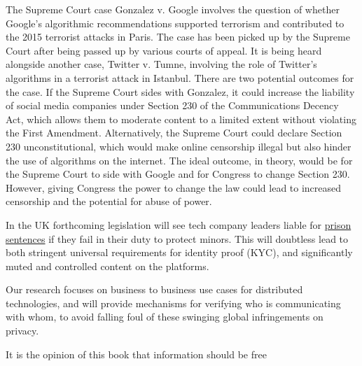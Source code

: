 The Supreme Court case Gonzalez v. Google involves the question of whether Google's algorithmic recommendations supported terrorism and contributed to the 2015 terrorist attacks in Paris. The case has been picked up by the Supreme Court after being passed up by various courts of appeal. It is being heard alongside another case, Twitter v. Tumne, involving the role of Twitter's algorithms in a terrorist attack in Istanbul. There are two potential outcomes for the case. If the Supreme Court sides with Gonzalez, it could increase the liability of social media companies under Section 230 of the Communications Decency Act, which allows them to moderate content to a limited extent without violating the First Amendment. Alternatively, the Supreme Court could declare Section 230 unconstitutional, which would make online censorship illegal but also hinder the use of algorithms on the internet. The ideal outcome, in theory, would be for the Supreme Court to side with Google and for Congress to change Section 230. However, giving Congress the power to change the law could lead to increased censorship and the potential for abuse of power.\par
In the UK forthcoming legislation will see tech company leaders liable for \href{https://www.independent.co.uk/news/uk/politics/bill-mps-iain-duncan-smith-molly-russell-rishi-sunak-b2263353.html}{prison sentences} if they fail in their duty to protect minors. This will doubtless lead to both stringent universal requirements for identity proof (KYC), and significantly muted and controlled content on the platforms.\par
Our research focuses on business to business use cases for distributed technologies, and will provide mechanisms for verifying who is communicating with whom, to avoid falling foul of these swinging global infringements on privacy.\par
It is the opinion of this book that information should be free \cite{swartz2008guerilla}
